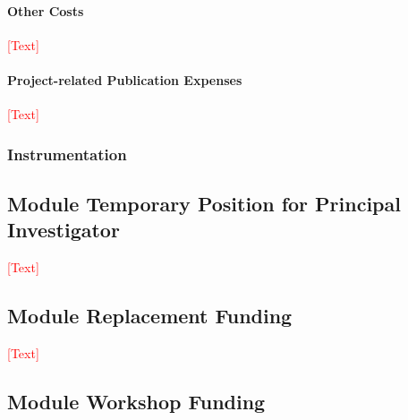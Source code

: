 \documentclass[a4paper,11pt]{article}
\begin{document}

\paragraph{Other Costs}

\noindent\textcolor{red}{[Text]}

\paragraph{Project-related Publication Expenses}

\noindent\textcolor{red}{[Text]}

\subsubsection{Instrumentation}






\subsection{Module Temporary Position for Principal Investigator}

\noindent\textcolor{red}{[Text]}

\subsection{Module Replacement Funding}

\noindent\textcolor{red}{[Text]} 





\subsection{Module Workshop Funding}
\end{document}
